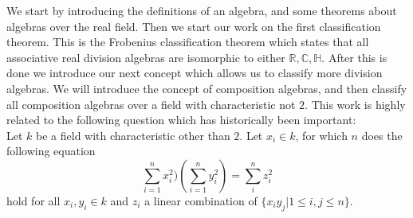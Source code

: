 \documentclass[../Thesis.tex]{subfiles}
\begin{document}
We start by introducing the definitions of an algebra, and some theorems about algebras over the real field. Then we start our work on the first classification theorem. This is the Frobenius classification theorem which states that all associative real division algebras are isomorphic to either $\mathbb{R}, \mathbb{C}, \mathbb{H}$. After this is done we introduce our next concept which allows us to classify more division algebras. We will introduce the concept of composition algebras, and then classify all composition algebras over a field with characteristic not $2$. This work is highly related to the following question which has historically been important:
\\Let $k$ be a field with characteristic other than $2$. Let $x_i \in k$, for which $n$ does the following equation
\begin{equation}
\sum_{i = 1}^nx^2_i)(\sum_{i=1}^ny_i^2) = \sum_i^n z_i^2
\end{equation}
hold for all $x_i, y_i \in k$ and $z_i$ a linear combination of $\{x_iy_j|1 \leq i,j \leq n \}$.
\end{document}
